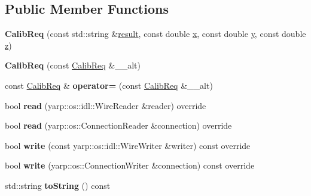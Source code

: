 \subsection*{Public Member Functions}
\begin{DoxyCompactItemize}
\item 
\mbox{\label{classCalibReq_a1af14762d3a28741137237b519488b48}} 
{\bfseries Calib\+Req} (const std\+::string \&\mbox{\hyperlink{classCalibReq_a02f03036d32f28fad1c1e533a139e75f}{result}}, const double \mbox{\hyperlink{classCalibReq_ac264bcfec43ddba85a4570920ec74ba0}{x}}, const double \mbox{\hyperlink{classCalibReq_a5f335f445b573d868c1f2b900b029db4}{y}}, const double \mbox{\hyperlink{classCalibReq_afe51cdf867f132c03e84ff5eec91a4d3}{z}})
\item 
\mbox{\label{classCalibReq_ac6703f948afe8290c2cd7dbf93059534}} 
{\bfseries Calib\+Req} (const \mbox{\hyperlink{classCalibReq}{Calib\+Req}} \&\+\_\+\+\_\+alt)
\item 
\mbox{\label{classCalibReq_a889eaa2b28d98083116e440ab5ea2cbd}} 
const \mbox{\hyperlink{classCalibReq}{Calib\+Req}} \& {\bfseries operator=} (const \mbox{\hyperlink{classCalibReq}{Calib\+Req}} \&\+\_\+\+\_\+alt)
\item 
\mbox{\label{classCalibReq_a70c79bda911a711ad20ee49e826801a0}} 
bool {\bfseries read} (yarp\+::os\+::idl\+::\+Wire\+Reader \&reader) override
\item 
\mbox{\label{classCalibReq_a3ed976c68bbeb9b9ae8285957abdeec5}} 
bool {\bfseries read} (yarp\+::os\+::\+Connection\+Reader \&connection) override
\item 
\mbox{\label{classCalibReq_aa68a5d0b67c1280f65ac2e071f1d02ee}} 
bool {\bfseries write} (const yarp\+::os\+::idl\+::\+Wire\+Writer \&writer) const override
\item 
\mbox{\label{classCalibReq_a0bc4e80ab7d893c9a6ca237c068ecd83}} 
bool {\bfseries write} (yarp\+::os\+::\+Connection\+Writer \&connection) const override
\item 
\mbox{\label{classCalibReq_a3cb80fc9efd2d48253297e26967176c6}} 
std\+::string {\bfseries to\+String} () const
\end{DoxyCompactItemize}

